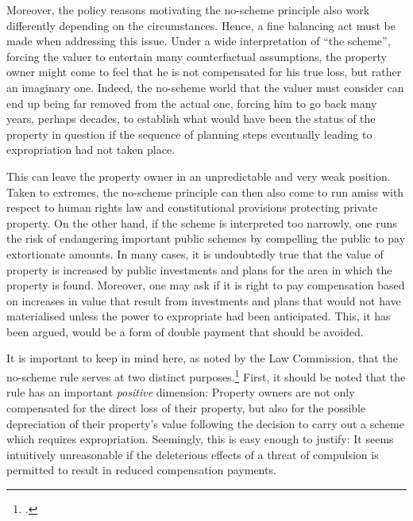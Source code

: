 Moreover, the policy reasons motivating the no-scheme principle also work differently depending on the circumstances. Hence, a fine balancing act must be made when addressing this issue. Under a wide interpretation of ``the scheme'', forcing the valuer to entertain many counterfactual assumptions, the property owner might come to feel that he is not compensated for his true loss, but rather an imaginary one. Indeed, the no-scheme world that the valuer must consider can end up being far removed from the actual one, forcing him to go back many years, perhaps decades, to establish what would have been the status of the property in question if the sequence of planning steps eventually leading to expropriation had not taken place. 

This can leave the property owner in an unpredictable and very weak position. Taken to extremes, the no-scheme principle can then also come to run amiss with respect to human rights law and constitutional provisions protecting private property. On the other hand, if the scheme is interpreted too narrowly, one runs the risk of endangering important public schemes by compelling the public to pay extortionate amounts. In many cases, it is undoubtedly true that the value of property is increased by public investments and plans for the area in which the property is found. Moreover, one may ask if it is right to pay compensation based on increases in value that result from investments and plans that would not have materialised unless the power to expropriate had been anticipated. This, it has been argued, would be a form of double payment that should be avoided.

It is important to keep in mind here, as noted by the Law Commission, that the no-scheme rule serves at two distinct purposes.\footcite[69-70]{lawcom03} First, it should be noted that the rule has an important \emph{positive} dimension: Property owners are not only compensated for the direct loss of their property, but also for the possible depreciation of their property's value following the decision to carry out a scheme which requires expropriation. Seemingly, this is easy enough to justify: It seems intuitively unreasonable if the deleterious effects of a threat of compulsion is permitted to result in reduced compensation payments.

